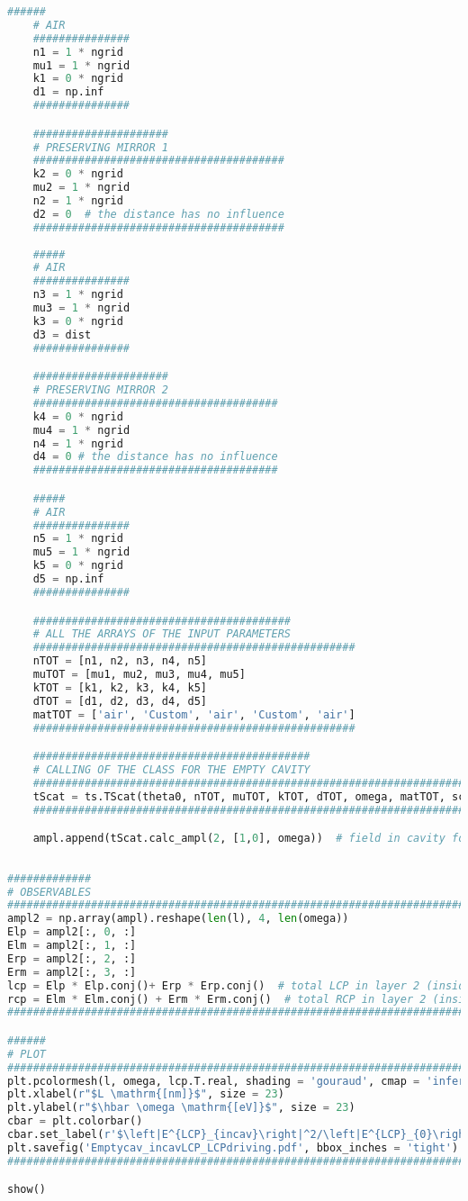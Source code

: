 \documentclass[aps,prl,10pt,onecolumn,superscriptaddress]{revtex4-2}
\begin{document}
\begin{lstlisting}[language=Python, caption=Script for Figure \ref{LCPlcp}]
    ######
    # AIR
    ###############
    n1 = 1 * ngrid
    mu1 = 1 * ngrid
    k1 = 0 * ngrid
    d1 = np.inf
    ###############

    #####################
    # PRESERVING MIRROR 1
    #######################################
    k2 = 0 * ngrid
    mu2 = 1 * ngrid
    n2 = 1 * ngrid
    d2 = 0  # the distance has no influence
    #######################################
    
    #####
    # AIR 
    ###############
    n3 = 1 * ngrid
    mu3 = 1 * ngrid
    k3 = 0 * ngrid
    d3 = dist
    ###############

    #####################
    # PRESERVING MIRROR 2
    ######################################
    k4 = 0 * ngrid
    mu4 = 1 * ngrid
    n4 = 1 * ngrid
    d4 = 0 # the distance has no influence
    ######################################  

    #####
    # AIR
    ###############
    n5 = 1 * ngrid
    mu5 = 1 * ngrid
    k5 = 0 * ngrid
    d5 = np.inf
    ###############

    ########################################
    # ALL THE ARRAYS OF THE INPUT PARAMETERS
    ##################################################
    nTOT = [n1, n2, n3, n4, n5] 
    muTOT = [mu1, mu2, mu3, mu4, mu5]
    kTOT = [k1, k2, k3, k4, k5] 
    dTOT = [d1, d2, d3, d4, d5] 
    matTOT = ['air', 'Custom', 'air', 'Custom', 'air']
    ##################################################

    ###########################################
    # CALLING OF THE CLASS FOR THE EMPTY CAVITY
    #########################################################################
    tScat = ts.TScat(theta0, nTOT, muTOT, kTOT, dTOT, omega, matTOT, scatTOT)  
    #########################################################################

    ampl.append(tScat.calc_ampl(2, [1,0], omega))  # field in cavity for an incoming LCP wave
    
    
#############
# OBSERVABLES
#####################################################################################    
ampl2 = np.array(ampl).reshape(len(l), 4, len(omega))       
Elp = ampl2[:, 0, :]
Elm = ampl2[:, 1, :]
Erp = ampl2[:, 2, :]
Erm = ampl2[:, 3, :]
lcp = Elp * Elp.conj()+ Erp * Erp.conj()  # total LCP in layer 2 (inside the cavity)
rcp = Elm * Elm.conj() + Erm * Erm.conj()  # total RCP in layer 2 (inside the cavity)
#####################################################################################

######
# PLOT
#####################################################################################
plt.pcolormesh(l, omega, lcp.T.real, shading = 'gouraud', cmap = 'inferno', norm=mcolors.LogNorm()) 
plt.xlabel(r"$L \mathrm{[nm]}$", size = 23)
plt.ylabel(r"$\hbar \omega \mathrm{[eV]}$", size = 23)
cbar = plt.colorbar()
cbar.set_label(r'$\left|E^{LCP}_{incav}\right|^2/\left|E^{LCP}_{0}\right|^2$', labelpad = -10, y = 1.1, rotation = 0, size = 14)
plt.savefig('Emptycav_incavLCP_LCPdriving.pdf', bbox_inches = 'tight')
######################################################################################

show()
\end{lstlisting}
\end{document}

